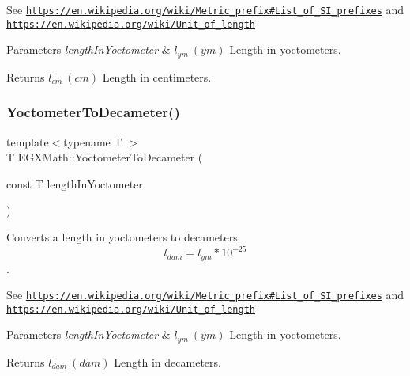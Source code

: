 See \href{https://en.wikipedia.org/wiki/Metric_prefix#List_of_SI_prefixes}{\tt https\+://en.\+wikipedia.\+org/wiki/\+Metric\+\_\+prefix\#\+List\+\_\+of\+\_\+\+S\+I\+\_\+prefixes} and \href{https://en.wikipedia.org/wiki/Unit_of_length}{\tt https\+://en.\+wikipedia.\+org/wiki/\+Unit\+\_\+of\+\_\+length} 
\begin{DoxyParams}{Parameters}
{\em length\+In\+Yoctometer} & $ l_{ym}\ (ym)$ Length in yoctometers. \\
\hline
\end{DoxyParams}
\begin{DoxyReturn}{Returns}
$ l_{cm}\ (cm)$ Length in centimeters. 
\end{DoxyReturn}
\mbox{\label{group___e_g_x_math-_conversions-_length_conversions-_s_i-_yoctometer-_s_i_ga63fd1a1af694ca9e3afdefb16cbeffd8}} 
\subsubsection{\texorpdfstring{Yoctometer\+To\+Decameter()}{YoctometerToDecameter()}}
{\footnotesize\ttfamily template$<$typename T $>$ \\
T E\+G\+X\+Math\+::\+Yoctometer\+To\+Decameter (\begin{DoxyParamCaption}\item[{const T}]{length\+In\+Yoctometer }\end{DoxyParamCaption})}



Converts a length in yoctometers to decameters. \[ l_{dam}=l_{ym} * 10^{-25} \]. 

See \href{https://en.wikipedia.org/wiki/Metric_prefix#List_of_SI_prefixes}{\tt https\+://en.\+wikipedia.\+org/wiki/\+Metric\+\_\+prefix\#\+List\+\_\+of\+\_\+\+S\+I\+\_\+prefixes} and \href{https://en.wikipedia.org/wiki/Unit_of_length}{\tt https\+://en.\+wikipedia.\+org/wiki/\+Unit\+\_\+of\+\_\+length} 
\begin{DoxyParams}{Parameters}
{\em length\+In\+Yoctometer} & $ l_{ym}\ (ym)$ Length in yoctometers. \\
\hline
\end{DoxyParams}
\begin{DoxyReturn}{Returns}
$ l_{dam}\ (dam)$ Length in decameters. 
\end{DoxyReturn}
\mbox{\label{group___e_g_x_math-_conversions-_length_conversions-_s_i-_yoctometer-_s_i_ga958e0eaa8ecc89db32a3f8189136360c}} 
